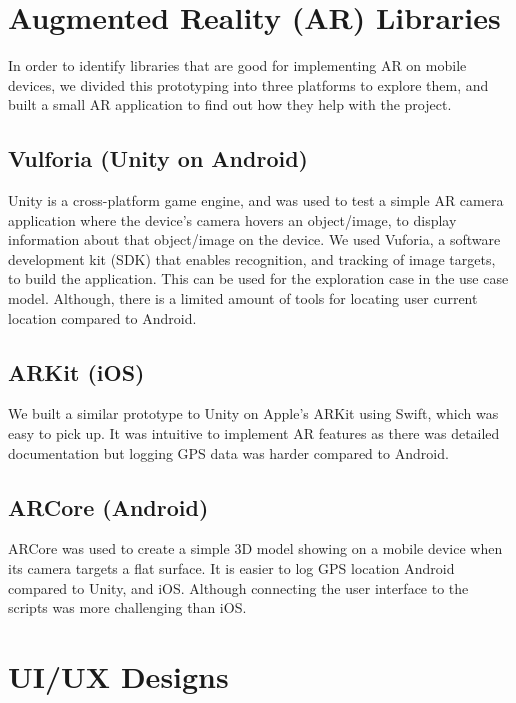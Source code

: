 
\section{Augmented Reality (AR) Libraries}
In order to identify libraries that are good for implementing AR on mobile devices, we divided this prototyping into three platforms to explore them, and built a small AR application to find out how they help with the project.

\subsection*{Vulforia (Unity on Android)}
Unity is a cross-platform game engine, and was used to test a simple AR camera application where the device's camera hovers an object/image, to display information about that object/image on the device. We used Vuforia, a software development kit (SDK) that enables recognition, and tracking of image targets, to build the application. This can be used for the exploration case in the use case model. Although, there is a limited amount of tools for locating user current location compared to Android.

\subsection*{ARKit (iOS)}
We built a similar prototype to Unity on Apple's ARKit using Swift, which was easy to pick up. It was intuitive to implement AR features as there was detailed documentation but logging GPS data was harder compared to Android.

\subsection*{ARCore (Android)}
ARCore was used to create a simple 3D model showing on a mobile device when its camera targets a flat surface. It is easier to log GPS location Android compared to Unity, and iOS. Although connecting the user interface to the scripts was more challenging than iOS.

\section{UI/UX Designs}